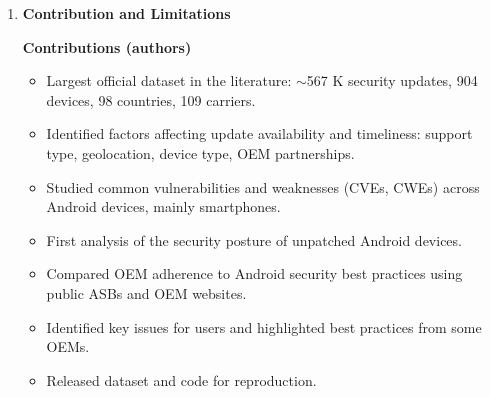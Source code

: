 \documentclass[11pt,a4paper]{article}
\newcommand{\entrypart}[1]{\textbf{\color{accent}#1}\par\vspace{2pt}}
\begin{document}
\begin{enumerate}
\begin{itemize}[leftmargin=*,itemsep=1pt,topsep=2pt]
\begin{itemize}[itemsep=0pt]
            \item Average Delay (days): Samsung 23.21, Huawei $\sim$13.85, Xiaomi 1.067, Oppo 1.66, Motorola 19.53, LG 52.56.
            \item Vivo: no delays found.
        \end{itemize}
        \item \textbf{Key issues (examples):}
        \begin{itemize}[itemsep=0pt]
            \item Galaxy S20 FE 5G: \texttt{SM-G781B/XEH} last updated October 2020 (Android 10); \texttt{SM-G781B/BGL} last updated May 2024 (Android 13).
            \item Galaxy M40 (\texttt{SM-M405F/SLK}): largest gap between last update and biannual support list date, 1492 days; 177 devices received only one update, 25 still listed with last update over 1000 days ago.
            \item Samsung AER: of 8220 pairs, 63.76\% (5241) updated in the last two months; 317 pairs had none in the past year, 129 in two years, 38 in three years.
            \item Samsung's February 2021 announcement: 85 devices, 7275 pairs; 493 pairs had no updates in the past year.
        \end{itemize}
        \item \textbf{Exemplary practices named:} guaranteed support dates (only Motorola and Pixel), end-of-support lists (Motorola, Xiaomi), model-level support lists (only Oppo), full patch lists with reasons for exclusions.
    \end{itemize}

    \item \entrypart{Contribution and Limitations}

    \textbf{Contributions (authors)}
    \begin{itemize}[leftmargin=*,itemsep=1pt,topsep=2pt]
        \item Largest official dataset in the literature: $\sim$567 K security updates, 904 devices, 98 countries, 109 carriers.
        \item Identified factors affecting update availability and timeliness: support type, geolocation, device type, OEM partnerships.
        \item Studied common vulnerabilities and weaknesses (CVEs, CWEs) across Android devices, mainly smartphones.
        \item First analysis of the security posture of unpatched Android devices.
        \item Compared OEM adherence to Android security best practices using public ASBs and OEM websites.
        \item Identified key issues for users and highlighted best practices from some OEMs.
        \item Released dataset and code for reproduction.
    \end{itemize}


\end{enumerate}
\end{document}
